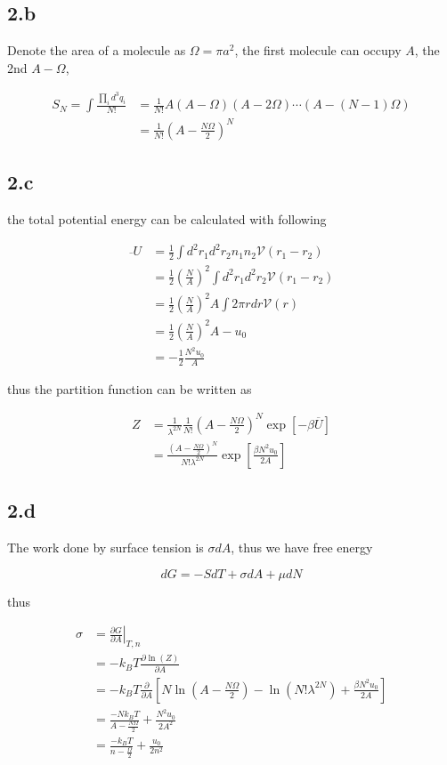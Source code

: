 \documentclass{article}
\begin{document}
\subsection*{2.b}
Denote the area of a molecule as $\Omega = \pi a^2$, the first molecule can occupy $A$, the 2nd $A - \Omega$,

$$
\begin{aligned}
    S_N = \int \frac{\prod_i d^3q_i}{N!} &= \frac{1}{N!} A (A-\Omega)(A-2\Omega)\cdots (A-(N-1)\Omega)\\
        &= \frac{1}{N!}(A - \frac{N\Omega}{2})^N
\end{aligned}
$$

\subsection*{2.c}
the total potential energy can be calculated with following

$$
\begin{aligned}
    \overline{}{U} &= \frac{1}{2}\int d^2r_1 d^2r_2 n_1 n_2 \mathcal{V}(r_1 - r_2)\\
      &= \frac{1}{2}(\frac{N}{A})^2 \int d^2r_1 d^2r_2 \mathcal{V}(r_1 - r_2)\\
      &= \frac{1}{2}(\frac{N}{A})^2 A \int 2\pi r dr \mathcal{V}(r)\\
      &= \frac{1}{2}(\frac{N}{A})^2 A -u_0\\
      &= -\frac{1}{2} \frac{N^2 u_0}{A}
\end{aligned}
$$

thus the partition function can be written as

$$
\begin{aligned}
    Z &= \frac{1}{\lambda^{2N}} \frac{1}{N!}(A - \frac{N\Omega}{2})^N \exp[-\beta \overline{U}]\\
    &=\frac{(A - \frac{N\Omega}{2})^N}{N!\lambda^{2N}}\exp[\frac{\beta N^2 u_0}{2A} ]
\end{aligned}
$$

\subsection*{2.d}
The work done by surface tension is $\sigma dA$, thus we have free energy

$$
dG = -SdT + \sigma dA + \mu dN
$$

thus

$$
\begin{aligned}
    \sigma &= \left.\frac{\partial G}{\partial A}\right|_{T, n}\\
    &= -k_B T \frac{\partial \ln(Z)}{\partial A}\\
    &= -k_B T \frac{\partial}{\partial A}[N\ln(A - \frac{N\Omega}{2}) - \ln(N!\lambda^{2N}) + \frac{\beta N^2 u_0}{2A}]\\
    &= \frac{-N k_B T}{A - \frac{N\Omega}{2}} + \frac{N^2 u_0}{2A^2}\\
    &= \frac{-k_B T}{n - \frac{\Omega}{2}} + \frac{u_0}{2n^2}
\end{aligned}
$$
\end{document}
